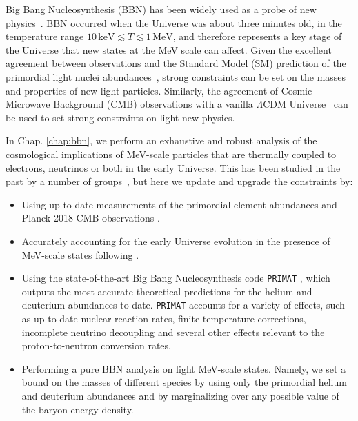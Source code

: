 Big Bang Nucleosynthesis (BBN) has been widely used as a probe of new physics~\cite{Sarkar:1995dd,Iocco:2008va,Pospelov:2010hj}. BBN occurred when the Universe was about three minutes old, in the temperature range $10\,\text{keV}  \lesssim T \lesssim 1\,\text{MeV}$, and therefore represents a key stage of the Universe that new states at the MeV scale can affect. Given the excellent agreement between observations and the Standard Model (SM) prediction of the primordial light nuclei abundances~\cite{pdg}, strong constraints can be set on the masses and properties of new light particles. Similarly, the agreement of Cosmic Microwave Background (CMB) observations with a vanilla $\Lambda$CDM Universe~\cite{Aghanim:2018eyx} can be used to set strong constraints on light new physics.

In Chap. \ref{chap:bbn}, we perform an exhaustive and robust analysis of the cosmological implications of MeV-scale particles that are thermally coupled to electrons, neutrinos or both in the early Universe. This has been studied in the past by a number of groups~\cite{Kolb:1986nf,Serpico:2004nm,Boehm:2013jpa,Nollett:2013pwa,Nollett:2014lwa,Boehm:2012gr,Ho:2012ug,Wilkinson:2016gsy,Depta:2019lbe,Escudero:2018mvt}, but here we update and upgrade the constraints by:
\begin{itemize}[leftmargin=0.5cm,itemsep=0pt]
\item Using up-to-date measurements of the primordial element abundances \cite{pdg} and Planck 2018 CMB observations \cite{Aghanim:2018eyx}.
\item Accurately accounting for the early Universe evolution in the presence of MeV-scale states following \cite{Escudero:2018mvt,Escudero:2019new}.
\item Using the state-of-the-art Big Bang Nucleosynthesis code \texttt{PRIMAT} \cite{Pitrou:2018cgg}, which outputs the most accurate theoretical predictions for the helium and deuterium abundances to date. \texttt{PRIMAT} accounts for a variety of effects, such as up-to-date nuclear reaction rates, finite temperature corrections, incomplete neutrino decoupling and several other effects relevant to the proton-to-neutron conversion rates.
\item Performing a pure BBN analysis on light MeV-scale states. Namely, we set a bound on the masses of different species by using only the primordial helium and deuterium abundances and by marginalizing over any possible value of the baryon energy density.
\end{itemize}

